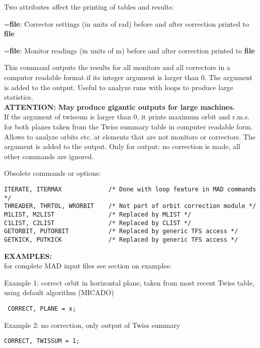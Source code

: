 Two attributes affect the printing of tables and results: 
\begin{madlist}
    =\textbf{file}: Corrector settings (in units of rad)
     before and after correction printed to \textbf{file} 

    =\textbf{file}: Monitor readings (in units of m) before
     and after correction printed to \textbf{file} 

    This command outputs the results for all monitors and
     all correctors in a computer readable format if its integer
     argument is larger than 0. The argument is added to the
     output. Useful to analyze runs with loops to produce large
     statistics. \\
     \textbf{ATTENTION: May produce gigantic outputs for large
       machines.} 
     \\

     If the argument of twissum is larger than 0, it
     prints maximum orbit and r.m.s. for both planes taken from the
     Twiss summary table in computer readable form. Allows to analyze
     orbits etc. at elements that are not monitors or correctors. The
     argument is added to the output.  Only for output: no correction is
     made, all other commands are ignored.  
\end{madlist}

Obsolete commands or options:
\begin{verbatim}
ITERATE, ITERMAX             /* Done with loop feature in MAD commands */
THREADER, THRTOL, WRORBIT    /* Not part of orbit correction module */
M1LIST, M2LIST               /* Replaced by MLIST */
C1LIST, C2LIST               /* Replaced by CLIST */
GETORBIT, PUTORBIT           /* Replaced by generic TFS access */
GETKICK, PUTKICK             /* Replaced by generic TFS access */
\end{verbatim}

{\bf EXAMPLES:}\\ 
for complete MAD input files see section on examples:

Example 1: correct orbit in horizontal plane, taken from most recent
Twiss table, using default algorithm (MICADO)
\begin{verbatim}
 CORRECT, PLANE = x; 
\end{verbatim}

Example 2: no correction, only output of Twiss summary 
\begin{verbatim}
CORRECT, TWISSUM = 1; 
\end{verbatim}

